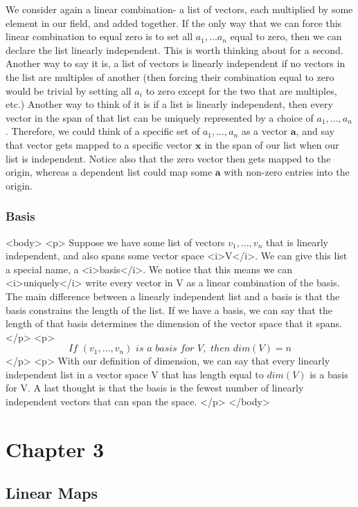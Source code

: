 \documentclass{book}
\begin{document}
     We consider again a linear combination- a list of vectors, each multiplied by some element in our field, and added together. If the only way that we can force this linear combination to equal zero is to set all $a_1,...a_n$ equal to zero, then we can declare the list linearly independent. This is worth thinking about for a second. Another way to say it is, a list of vectors is linearly independent if no vectors in the list are multiples of another (then forcing their combination equal to zero would be trivial by setting all $a_i$ to zero except for the two that are multiples, etc.) Another way to think of it is if a list is linearly independent, then every vector in the span of that list can be uniquely represented by a choice of $a_1,...,a_n$. Therefore, we could think of a specific set of $a_1,...,a_n$ as a vector $\pmb{a}$, and say that vector gets mapped to a specific vector $\pmb{x}$ in the span of our list when our list is independent. Notice also that the zero vector then gets mapped to the origin, whereas a dependent list could map some $\pmb{a}$ with non-zero entries into the origin.

\subsection{Basis}

<body>
   <p>
     Suppose we have some list of vectors $v_1,...,v_n$ that is linearly independent, and also spans some vector space <i>V</i>. We can give this list a special name, a <i>basis</i>. We notice that this means we can <i>uniquely</i> write every vector in V as a linear combination of the basis. The main difference between a linearly independent list and a basis is that the basis constrains the length of the list. If we have a basis, we can say that the length of that basis determines the dimension of the vector space that it spans. 
   </p>
   <p>
     $$If\,\,(v_1,...,v_n)\,\,is\,\,a\,\,basis\,\,for\,\,V,\,\,then\,\,dim(V) = n$$
   </p>
   <p>
     With our definition of dimension, we can say that every linearly independent list in a vector space V that has length equal to $dim(V)$ is a basis for V. A last thought is that the basis is the fewest number of linearly independent vectors that can span the space.
   </p>
</body> 

\chapter{Chapter 3}
\section{Linear Maps}
\end{document}
